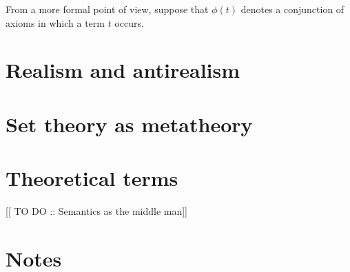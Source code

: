 
From a more formal point of view, suppose that $\phi (t)$ denotes a
conjunction of axioms in which a term $t$ occurs.









\section{Realism and antirealism}


\section{Set theory as metatheory}


\section{Theoretical terms}

[[ TO DO :: Semantics as the middle man]]



\section{Notes}

